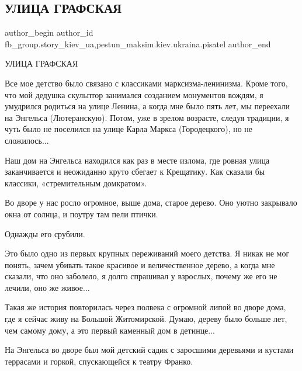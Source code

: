 
 
 
 
 
 
\subsection{УЛИЦА ГРАФСКАЯ}
\label{sec:15_01_2022.fb.fb_group.story_kiev_ua.2.ulica_grafskaja}
 
\ifcmt
 author_begin
   author_id fb_group.story_kiev_ua,pestun_maksim.kiev.ukraina.pisatel
 author_end
\fi

УЛИЦА ГРАФСКАЯ

Все мое детство было связано с классиками марксизма-ленинизма. Кроме того, что
мой дедушка скульптор занимался созданием монументов вождям, я умудрился
родиться на улице Ленина, а когда мне было пять лет, мы переехали на Энгельса
(Лютеранскую). Потом, уже в зрелом возрасте, следуя традиции, я чуть было не
поселился на улице Карла Маркса (Городецкого), но не сложилось...

Наш дом на Энгельса находился как раз в месте излома, где ровная улица
заканчивается и неожиданно круто сбегает к Крещатику. Как сказали бы классики,
«стремительным домкратом».

Во дворе у нас росло огромное, выше дома, старое дерево. Оно уютно закрывало
окна от солнца, и поутру там пели птички.

Однажды его срубили.

Это было одно из первых крупных переживаний моего детства. Я никак не мог
понять, зачем убивать такое красивое и величественное дерево, а когда мне
сказали, что оно заболело, я долго спрашивал у взрослых, почему же его не
лечили, оно же живое...

Такая же история повторилась через полвека с огромной липой во дворе дома, где
я сейчас живу на Большой Житомирской. Думаю, дереву было больше лет, чем самому
дому, а это первый каменный дом в детинце...

На Энгельса во дворе был мой детский садик с заросшими деревьями и кустами
террасами и горкой, спускающейся к театру Франко.

